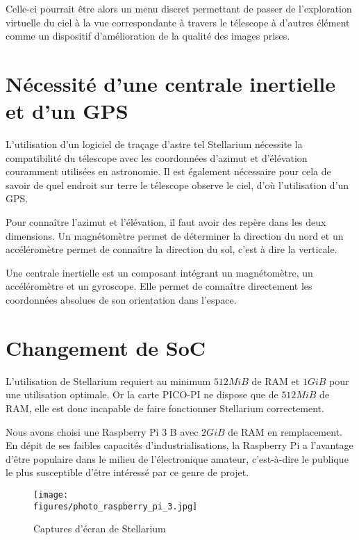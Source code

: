 Celle-ci pourrait être alors un menu discret permettant de passer de l'exploration virtuelle du ciel à la vue correspondante à travers le télescope à d'autres élément comme un dispositif d'amélioration de la qualité des images prises.

\section{Nécessité d'une centrale inertielle et d'un GPS}

L'utilisation d'un logiciel de traçage d'astre tel Stellarium nécessite la compatibilité du télescope avec les coordonnées d'azimut et d'élévation couramment utilisées en astronomie. Il est également nécessaire pour cela de savoir de quel endroit sur terre le télescope observe le ciel, d'où l'utilisation d'un GPS.

\vspace{1cm}

Pour connaître l'azimut et l'élévation, il faut avoir des repère dans les deux dimensions. Un magnétomètre permet de déterminer la direction du nord et un accéléromètre permet de connaître la direction du sol, c'est à dire la verticale.

Une centrale inertielle est un composant intégrant un magnétomètre, un accéléromètre et un gyroscope. Elle permet de connaître directement les coordonnées absolues de son orientation dans l'espace.

\section{Changement de SoC}

L'utilisation de Stellarium requiert au minimum $512MiB$ de RAM et $1GiB$ pour une utilisation optimale. Or la carte PICO-PI ne dispose que de $512MiB$ de RAM, elle est donc incapable de faire fonctionner Stellarium correctement.

\vspace{1cm}

Nous avons choisi une Raspberry Pi 3 B avec $2GiB$ de RAM en remplacement. En dépit de ses faibles capacités d'industrialisations, la Raspberry Pi a l'avantage d'être populaire dans le milieu de l'électronique amateur, c'est-à-dire le publique le plus susceptible d'être intéressé par ce genre de projet.

\begin{figure}[H]
    \centering
    \texttt{[image: \\figures/photo\_raspberry\_pi\_3.jpg]}
    \decoRule
    \caption[
    Captures d'écran de Stellarium]{
    Captures d'écran de Stellarium}
    \label{fig:Captures d'écran de Stellarium}
    \end{figure}

